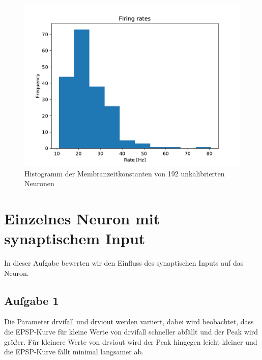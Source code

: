 \documentclass[10pt,a4paper]{scrartcl}
\begin{document}
\begin{figure} [ht]
\begin{center}
\label{fig:abb05}
\caption{Histogramm der Membranzeitkonstanten von 192 unkalibrierten Neuronen}
\includegraphics[scale=0.35]{pictures/firing_rates.pdf} 
\end{center}
\end{figure}


\newpage


\section{Einzelnes Neuron mit synaptischem Input}
In dieser Aufgabe bewerten wir den Einfluss des synaptischen Inputs auf das Neuron.


\subsection{Aufgabe 1}
Die Parameter drvifall und drviout werden variiert, dabei wird beobachtet, dass die EPSP-Kurve für kleine Werte von drvifall schneller abfällt und der Peak wird größer. Für kleinere Werte von drviout wird der Peak hingegen leicht kleiner und die EPSP-Kurve fällt minimal langsamer ab.
\end{document}
